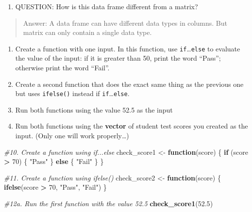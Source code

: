 \documentclass[
]{article}
\newenvironment{Shaded}{\begin{snugshade}}{\end{snugshade}}
\newcommand{\CommentTok}[1]{\textcolor[rgb]{0.56,0.35,0.01}{\textit{#1}}}
\newcommand{\ControlFlowTok}[1]{\textcolor[rgb]{0.13,0.29,0.53}{\textbf{#1}}}
\newcommand{\DecValTok}[1]{\textcolor[rgb]{0.00,0.00,0.81}{#1}}
\newcommand{\FloatTok}[1]{\textcolor[rgb]{0.00,0.00,0.81}{#1}}
\newcommand{\FunctionTok}[1]{\textcolor[rgb]{0.13,0.29,0.53}{\textbf{#1}}}
\newcommand{\NormalTok}[1]{#1}
\newcommand{\OtherTok}[1]{\textcolor[rgb]{0.56,0.35,0.01}{#1}}
\newcommand{\SpecialCharTok}[1]{\textcolor[rgb]{0.81,0.36,0.00}{\textbf{#1}}}
\newcommand{\StringTok}[1]{\textcolor[rgb]{0.31,0.60,0.02}{#1}}
\providecommand{\tightlist}{%
  \setlength{\itemsep}{0pt}\setlength{\parskip}{0pt}}
\begin{document}
\begin{enumerate}
\def\labelenumi{\arabic{enumi}.}
\setcounter{enumi}{8}
\tightlist
\item
  QUESTION: How is this data frame different from a matrix?
\end{enumerate}

\begin{quote}
Answer: A data frame can have different data types in columns. But
matrix can only contain a single data type.
\end{quote}

\begin{enumerate}
\def\labelenumi{\arabic{enumi}.}
\setcounter{enumi}{9}
\item
  Create a function with one input. In this function, use
  \texttt{if}\ldots{}\texttt{else} to evaluate the value of the input:
  if it is greater than 50, print the word ``Pass''; otherwise print the
  word ``Fail''.
\item
  Create a second function that does the exact same thing as the
  previous one but uses \texttt{ifelse()} instead if
  \texttt{if}\ldots{}\texttt{else}.
\item
  Run both functions using the value 52.5 as the input
\item
  Run both functions using the \textbf{vector} of student test scores
  you created as the input. (Only one will work properly\ldots)
\end{enumerate}

\begin{Shaded}
\begin{Highlighting}[]
\CommentTok{\#10. Create a function using if...else}
\NormalTok{check\_score1 }\OtherTok{\textless{}{-}} \ControlFlowTok{function}\NormalTok{(score) \{}
  \ControlFlowTok{if}\NormalTok{ (score }\SpecialCharTok{\textgreater{}} \DecValTok{70}\NormalTok{) \{}
    \StringTok{"Pass"}
\NormalTok{  \} }\ControlFlowTok{else}\NormalTok{ \{}
    \StringTok{"Fail"}
\NormalTok{  \}}
\NormalTok{\}}

\CommentTok{\#11. Create a function using ifelse()}
\NormalTok{check\_score2 }\OtherTok{\textless{}{-}} \ControlFlowTok{function}\NormalTok{(score) \{}
  \FunctionTok{ifelse}\NormalTok{(score }\SpecialCharTok{\textgreater{}} \DecValTok{70}\NormalTok{, }\StringTok{"Pass"}\NormalTok{, }\StringTok{"Fail"}\NormalTok{)}
\NormalTok{\}}

\CommentTok{\#12a. Run the first function with the value 52.5}
\FunctionTok{check\_score1}\NormalTok{(}\FloatTok{52.5}\NormalTok{)}
\end{Highlighting}
\end{Shaded}
\end{document}
